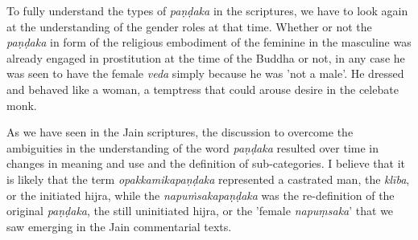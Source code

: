 To fully understand the types of {\em paṇḍaka} in the scriptures, we have to look again at the understanding of the gender roles at that time. Whether or not the {\em paṇḍaka} in form of the religious embodiment of the feminine in the masculine was already engaged in prostitution at the time of the Buddha or not, in any case he was seen to have the female {\em veda} simply because he was 'not a male'. He dressed and behaved like a woman, a temptress that could arouse desire in the celebate monk. 

As we have seen in the Jain scriptures, the discussion to overcome the ambiguities in the understanding of the word {\em paṇḍaka} resulted over time in changes in meaning and use and the definition of sub-categories. I believe that it is likely that the term {\em opakkamikapaṇḍaka} represented a castrated man, the {\em klība}, or the initiated hijra, while the {\em napuṁsakapaṇḍaka} was the re-definition of the original {\em paṇḍaka}, the still uninitiated hijra, or the 'female {\em napuṃsaka}' that we saw emerging in the Jain commentarial texts.

